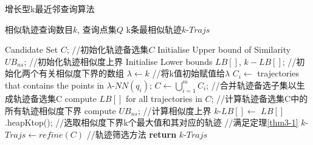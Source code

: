 \begin{algorithm}[H] %
\caption{增长型k最近邻查询算法}
\label{algo:iknn}
\begin{algorithmic}[1] %
\Require 相似轨迹查询数目$k$, 查询点集$Q$ %
\Ensure k条最相似轨迹$k$-$Trajs$ %

\State Candidate Set $C$; //初始化轨迹备选集$C$
\State Initialise Upper bound of Similarity $UB_{ns}$; //初始化轨迹相似度上界
\State Initialise Lower bounds $LB[]$, $k-LB[]$; //初始化两个有关相似度下界的数组
\State $\lambda \gets k$ //将k值初始赋值给$\lambda$
		\State $C_{i}\gets$ trajectories that contains the points in $\lambda$-$NN(q_{i})$;
	\EndFor
	\State $C \gets\bigcup_{i=1}^{m}C_{i}$; //合并轨迹备选子集以生成轨迹备选集C
		\State compute $LB[]$ for all trajectories in $C$; //计算轨迹备选集C中的所有轨迹相似度下界
		\State compute $UB_{ns}$; //计算相似度上界
		\State $k$-$LB[]\gets$ $LB[]$.heapKtop(); //选取相似度下界k个最大值和其对应的轨迹
		 //满足定理\ref{thm3-1}
			\State $k$-$Trajs\gets refine(C)$ //轨迹筛选方法
			\State \textbf{return} $k$-$Trajs$ 
		\EndIf
		 
	\EndIf
\EndWhile
	

\end{algorithmic}
\end{algorithm}


